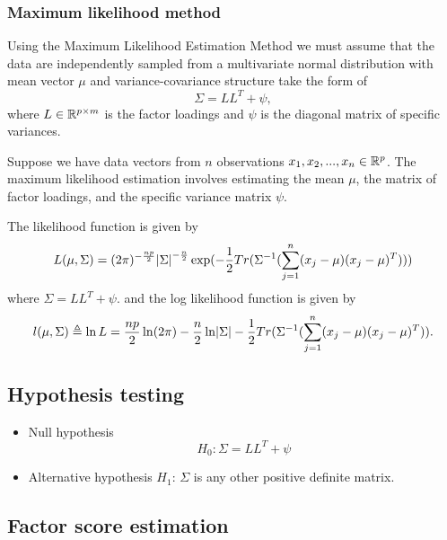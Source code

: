 \begin{refsection}
\begin{remark}
\end{remark}

\subsubsection{Maximum likelihood method}

\begin{remark}
Using the Maximum Likelihood Estimation Method we must assume that the data are independently sampled from a multivariate normal distribution with mean vector $\mu$ and variance-covariance structure take the form of
$$\Sigma = LL^T + \psi,$$
where $L\in \mathbb{R}^{p\times m}$ is the factor loadings and $\psi$ is the diagonal matrix of specific variances.
\end{remark}



\begin{lemma}\cite[496]{johnson2007applied}
	
Suppose we have data vectors from $n$ observations $x_1,x_2,...,x_n \in \mathbb{R}^p$. The maximum likelihood estimation involves estimating the mean $\mu$, the matrix of factor loadings, and the specific variance matrix $\psi$.

The likelihood function is given by	
	$$L(\mu,\Sigma)=(2\pi)^{-\frac{np}{2}}\abs{\Sigma}^{-\frac{n}{2}}\exp(-\frac{1}{2}Tr(\Sigma^{-1}(\sum_{j=1}^{n}(x_j-\mu)(x_j-\mu)^T))) $$
where $\Sigma = LL^T + \psi.$
and the log likelihood function is given by
	$$l(\mu,\Sigma)\triangleq \ln L =\frac{np}{2}\ln (2\pi)-\frac{n}{2}\ln \abs{\Sigma} -\frac{1}{2}Tr(\Sigma^{-1}(\sum_{j=1}^{n}(x_j-\mu)(x_j-\mu)^T)).$$	
\end{lemma}

\subsection{Hypothesis testing}

\begin{definition}\cite[495]{johnson2007applied}

\begin{itemize}
	\item Null hypothesis
	$$H_0: \Sigma = LL^T + \psi$$
	\item Alternative hypothesis
	$H_1$: $\Sigma$ is any other positive definite matrix. 
\end{itemize}	
\end{definition}


\subsection{Factor score estimation}


\end{refsection}
